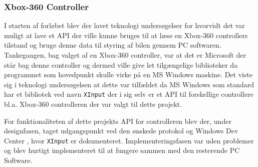 \subsubsection{Xbox-360 Controller} \label{sec:controller}
I starten af forløbet blev der lavet teknologi undersøgelser for hvorvidt det var muligt at lave et API der ville kunne bruges til at læse en Xbox-360 controllers tilstand og bruge denne data til styring af bilen gennem PC softwaren. Tankegangen, bag valget af en Xbox-360 controller, var at det er Microsoft der står bag denne controller og dermed ville give let tilgængelige biblioteker da programmet som hovedpunkt skulle virke på en MS Windows maskine. Det viste sig i teknologi undersøgelsen at dette var tilfældet da MS Windows som standard har et bibliotek ved navn \texttt{XInput} der i sig selv er et API til forskellige controllere bl.a. Xbox-360 controlleren der var valgt til dette projekt.

For funktionaliteten af dette projekts API for controlleren blev der, under designfasen, taget udgangspunkt ved den ønskede protokol og Windows Dev Center \cite{lib:windows_xinput}, hvor \texttt{XInput} er dokumenteret. Implementeringsfasen var uden problemer og blev hurtigt implementeret til at fungere sammen med den resterende PC Software.